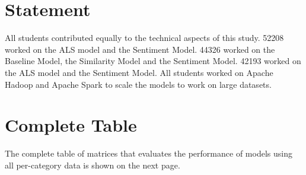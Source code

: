 \documentclass[sigconf,authorversion,nonacm]{acmart}
\begin{document}



\section{Statement}
All students contributed equally to the technical aspects of this study. 52208 worked on the ALS model and the Sentiment Model. 44326 worked on the Baseline Model, the Similarity Model and the Sentiment Model. 42193 worked on the ALS model and the Sentiment Model. All students worked on Apache Hadoop and Apache Spark to scale the models to work on large datasets. 
\appendix
\section{Complete Table}
The complete table of matrices that evaluates the performance of models using all per-category data is shown on the next page.
\end{document}
